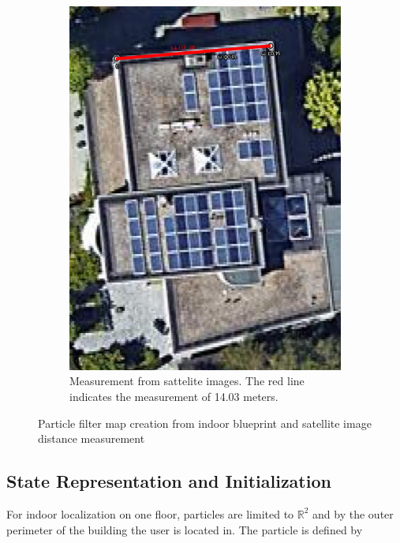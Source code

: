 \begin{figure}[H]
\begin{subfigure}[t]{.4\textwidth}
		\includegraphics[width=0.9\linewidth]{images/house_google_maps}
		\caption{ Measurement from sattelite images. The red line indicates the measurement of 14.03 meters.}
		\label{fig:house_google_maps}
	\end{subfigure} \quad
	\label{fig:particle_map_construction}
		\setlength{\belowcaptionskip}{-20pt}
	\caption{Particle filter map creation from indoor blueprint and satellite image distance measurement}
\end{figure}

\subsection{State Representation and Initialization}
For indoor localization on one floor, particles are limited to $\mathbb{R}^{2}$ and by the outer perimeter of the building the user is located in. The particle is defined by 

